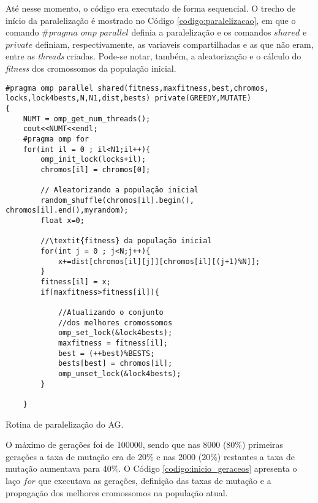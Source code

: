Até nesse momento, o código era executado de forma sequencial. O trecho de início da paralelização é mostrado no Código \ref{codigo:paralelizacao}, em que o comando $\#pragma$ $omp$ $parallel$ definia a paralelização e os comandos $shared$ e $private$ definiam, respectivamente, as variaveis compartilhadas e as que não eram, entre as \textit{threads} criadas. Pode-se notar, também, a aleatorização e o cálculo do \textit{fitness} dos cromossomos da população inicial.

\begin{codigo}[!htb]
	\begin{Verbatim}
#pragma omp parallel shared(fitness,maxfitness,best,chromos,
locks,lock4bests,N,N1,dist,bests) private(GREEDY,MUTATE)
{
	NUMT = omp_get_num_threads();
	cout<<NUMT<<endl;
	#pragma omp for
	for(int il = 0 ; il<N1;il++){
		omp_init_lock(locks+il);
		chromos[il] = chromos[0];

		// Aleatorizando a população inicial
		random_shuffle(chromos[il].begin(), chromos[il].end(),myrandom);
		float x=0;
		
		//\textit{fitness} da população inicial								
		for(int j = 0 ; j<N;j++){
			x+=dist[chromos[il][j]][chromos[il][(j+1)%N]];
		}
		fitness[il] = x;
		if(maxfitness>fitness[il]){

			//Atualizando o conjunto 
			//dos melhores cromossomos
			omp_set_lock(&lock4bests);  
			maxfitness = fitness[il];		
			best = (++best)%BESTS;
			bests[best] = chromos[il];
			omp_unset_lock(&lock4bests);
		}

	}
	\end{Verbatim}
	\caption{Rotina de paralelização do AG.} \label{codigo:paralelizacao}
\end{codigo}

O máximo de gerações foi de 100000, sendo que nas 8000 (80\%) primeiras gerações a taxa de mutação era de 20\% e nas 2000 (20\%) restantes a taxa de mutação aumentava para 40\%. O Código \ref{codigo:inicio_geraceos} apresenta o laço $for$ que executava as gerações, definição das taxas de mutação e a propagação dos melhores cromossomos na população atual.

